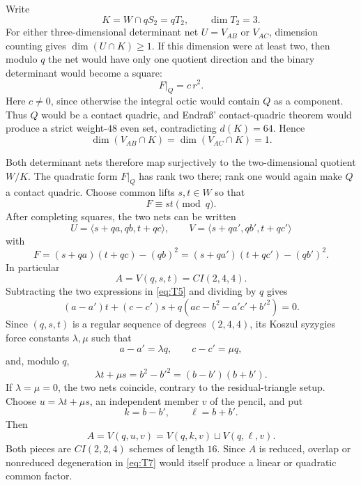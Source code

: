 \documentclass[11pt,reqno]{amsart}
\theoremstyle{remark}
\begin{document}
Write
\[
K=W\cap qS_2=qT_2,
\qquad \dim T_2=3.
\]
For either three-dimensional determinant net $U=V_{AB}$ or $V_{AC}$, dimension counting gives $\dim(U\cap K)\ge1$.  If this dimension were at least two, then modulo $q$ the net would have only one quotient direction and the binary determinant would become a square:
\[
F|_Q=c\,r^2.
\]
Here $c\ne0$, since otherwise the integral octic would contain $Q$ as a component.  Thus $Q$ would be a contact quadric, and Endra\ss' contact-quadric theorem would produce a strict weight-$48$ even set, contradicting $d(K)=64$.  Hence
\[
\dim(V_{AB}\cap K)=\dim(V_{AC}\cap K)=1. \tag{T4}\label{eq:T4}
\]

Both determinant nets therefore map surjectively to the two-dimensional quotient $W/K$.  The quadratic form $F|_Q$ has rank two there; rank one would again make $Q$ a contact quadric.  Choose common lifts $s,t\in W$ so that
\[
F\equiv st\pmod q.
\]
After completing squares, the two nets can be written
\[
U=\langle s+qa,qb,t+qc\rangle,
\qquad
V=\langle s+qa',qb',t+qc'\rangle
\]
with
\[
F=(s+qa)(t+qc)-(qb)^2
 =(s+qa')(t+qc')-(qb')^2. \tag{T5}\label{eq:T5}
\]
In particular
\[
A=V(q,s,t)=CI(2,4,4).
\]
Subtracting the two expressions in \eqref{eq:T5} and dividing by $q$ gives
\[
(a-a')t+(c-c')s
 +q(ac-b^2-a'c'+b'^2)=0.
\]
Since $(q,s,t)$ is a regular sequence of degrees $(2,4,4)$, its Koszul syzygies force constants $\lambda,\mu$ such that
\[
a-a'=\lambda q,
\qquad
c-c'=\mu q,
\]
and, modulo $q$,
\[
\lambda t+\mu s=b^2-b'^2=(b-b')(b+b'). \tag{T6}\label{eq:T6}
\]
If $\lambda=\mu=0$, the two nets coincide, contrary to the residual-triangle setup.  Choose $u=\lambda t+\mu s$, an independent member $v$ of the pencil, and put
\[
k=b-b',\qquad \ell=b+b'.
\]
Then
\[
A=V(q,u,v)=V(q,k,v)\sqcup V(q,\ell,v). \tag{T7}\label{eq:T7}
\]
Both pieces are $CI(2,2,4)$ schemes of length $16$.  Since $A$ is reduced, overlap or nonreduced degeneration in \eqref{eq:T7} would itself produce a linear or quadratic common factor.
\end{document}
